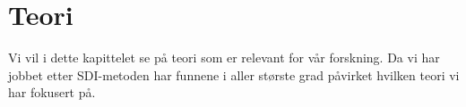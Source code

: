 \chapter{Teori}
\label{chp:teori} 

Vi vil i dette kapittelet se på teori som er relevant for vår forskning. Da vi har jobbet etter SDI-metoden har funnene i aller største grad påvirket hvilken teori vi har fokusert på. 